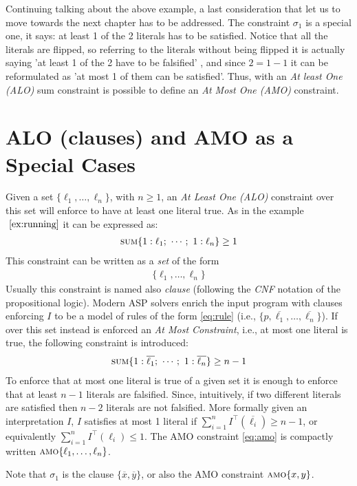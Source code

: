 Continuing talking about the above example, a last consideration that let us to move towards the next 
chapter has to be addressed.
The constraint $\sigma_1$ is a special one, it says: at least 1 of the 2 literals
has to be satisfied. Notice that all the literals are flipped, 
so referring to the literals without being flipped it is 
actually saying 'at least 1 of the 2 have to be falsified' , and since $2 = 1 - 1$ it can be 
reformulated as 'at most 1 of them can be satisfied'.
Thus, with an \textit{At least One (ALO)} sum constraint is possible to define an \textit{At Most One (AMO)}
constraint.

\section{ALO (clauses) and AMO as a Special Cases}
\label{sec:bg-clauses_AMO}

Given a set $\{\ell_1, \hdots, \ell_n\}$, with $n \ge 1$, an \textit{At Least One (ALO)} 
constraint over this set will enforce to have at least one literal true.
As in the example $~\ref{ex:running}$ it can be expressed as:
\begin{align}\label{eq:ALO}
    \textsc{sum}\{1 : \ell_1;\ \cdots;\ 1 : \ell_n\} \geq 1
\end{align}
This constraint can be written as a \textit{set} of the form 
\begin{align}
    \label{eq:clauses}
    \{\ell_1, \hdots, \ell_n\}
\end{align} 
Usually this constraint is named also \textit{clause} (following the \textit{CNF} notation 
of the propositional logic).
Modern ASP solvers enrich the input program with clauses enforcing $I$ to be a 
model of rules of the form \eqref{eq:rule} (i.e., $\{p, \overline{\ell_1}, \ldots, \overline{\ell_n}\}$).
If over this set instead is enforced an \textit{At Most Constraint}, i.e., at most 
one literal is true, the following constraint is introduced:
\begin{align}\label{eq:amo}
    \textsc{sum}\{1 : \overline{\ell_1};\ \cdots;\ 1 : \overline{\ell_n}\} \geq n - 1
\end{align}
To enforce that at most
one literal is true of a given set it is enough to enforce that 
at least $n-1$ literals are falsified.
Since, intuitively, if two different literals are satisfied then $n-2$ literals are not falsified.
More formally given an interpretation $I$, $I$ satisfies at most 1 literal if 
$\sum_{i = 1}^{n}{I^{\top}(\overline{\ell_i})} \geq n - 1$, or equivalently
$\sum_{i = 1}^{n}{I^{\top}(\ell_i)} \leq 1$.
The AMO constraint \eqref{eq:amo} is compactly written $\textsc{amo}\{\ell_1,\ldots,\ell_n\}$.
\begin{example}
    Note that $\sigma_1$ is the clause $\{\overline{x}, \overline{y}\}$, or also the AMO constraint $\textsc{amo}\{x, y\}$.
\end{example}
